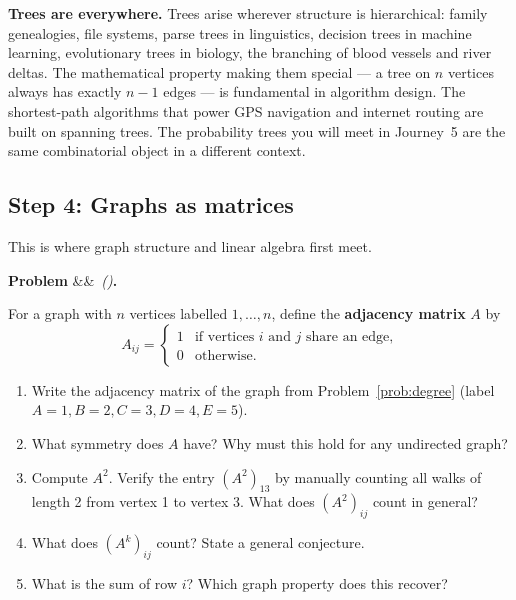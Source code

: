 \documentclass[12pt, a4paper]{article}
\newcounter{problem}
\newenvironment{problem}[1][]{%
  \refstepcounter{problem}%
  \par\vspace{6pt}%
  \noindent\textbf{\color{MidBlue}Problem \theproblem}%
  \ifx&#1&\else\ \textit{(#1)}\fi\textbf{.}\enskip
}{\par\vspace{4pt}}
\begin{document}
\begin{center}
\end{center}

\begin{thought}
\textbf{Trees are everywhere.}
Trees arise wherever structure is hierarchical: family genealogies, file systems, parse trees in linguistics, decision trees in machine learning, evolutionary trees in biology, the branching of blood vessels and river deltas. The mathematical property making them special --- a tree on $n$ vertices always has exactly $n-1$ edges --- is fundamental in algorithm design. The shortest-path algorithms that power GPS navigation and internet routing are built on spanning trees. The probability trees you will meet in Journey~5 are the same combinatorial object in a different context.
\end{thought}

\subsection{Step 4: Graphs as matrices}

This is where graph structure and linear algebra first meet.

\begin{problem}
\label{prob:adjacency}
For a graph with $n$ vertices labelled $1, \ldots, n$, define the \textbf{adjacency matrix} $A$ by
\[
  A_{ij} = \begin{cases} 1 & \text{if vertices } i \text{ and } j \text{ share an edge,} \\ 0 & \text{otherwise.} \end{cases}
\]
\begin{enumerate}[label=(\alph*),topsep=2pt]
  \item Write the adjacency matrix of the graph from Problem~\ref{prob:degree} (label $A=1, B=2, C=3, D=4, E=5$).
  \item What symmetry does $A$ have? Why must this hold for any undirected graph?
  \item Compute $A^2$. Verify the entry $(A^2)_{13}$ by manually counting all walks of length 2 from vertex 1 to vertex 3. What does $(A^2)_{ij}$ count in general?
  \item What does $(A^k)_{ij}$ count? State a general conjecture.
  \item What is the sum of row $i$? Which graph property does this recover?
\end{enumerate}
\end{problem}
\end{document}
